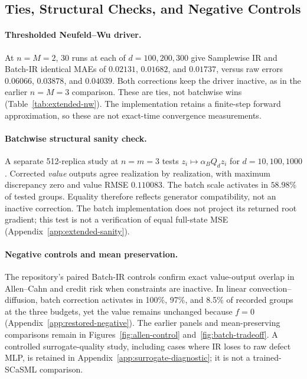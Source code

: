 \documentclass{article}
\begin{document}
\subsection{Ties, Structural Checks, and Negative Controls}
\paragraph{Thresholded Neufeld--Wu driver.}
At $n=M=2$, 30 runs at each of $d=100,200,300$ give Samplewise IR and Batch-IR identical MAEs of $0.02131$, $0.01682$, and $0.01737$, versus raw errors $0.06066$, $0.03878$, and $0.04039$. Both corrections keep the driver inactive, as in the earlier $n=M=3$ comparison. These are ties, not batchwise wins (Table~\ref{tab:extended-nw}). The implementation retains a finite-step forward approximation, so these are not exact-time convergence measurements.

\paragraph{Batchwise structural sanity check.}
A separate 512-replica study at $n=m=3$ tests $z_i\mapsto\alpha_BQ_dz_i$ for $d=10,100,1000$. Corrected \emph{value} outputs agree realization by realization, with maximum discrepancy zero and value RMSE $0.110083$. The batch scale activates in $58.98\%$ of tested groups. Equality therefore reflects generator compatibility, not an inactive correction. The batch implementation does not project its returned root gradient; this test is not a verification of equal full-state MSE (Appendix~\ref{app:extended-sanity}).

\paragraph{Negative controls and mean preservation.}
The repository's paired Batch-IR controls confirm exact value-output overlap in Allen--Cahn and credit risk when constraints are inactive. In linear convection--diffusion, batch correction activates in 100\%, 97\%, and 8.5\% of recorded groups at the three budgets, yet the value remains unchanged because $f=0$ (Appendix~\ref{app:restored-negative}). The earlier panels and mean-preserving comparisons remain in Figures~\ref{fig:allen-control} and~\ref{fig:batch-tradeoff}. A controlled surrogate-quality study, including cases where IR loses to raw defect MLP, is retained in Appendix~\ref{app:surrogate-diagnostic}; it is not a trained-SCaSML comparison.
\end{document}
